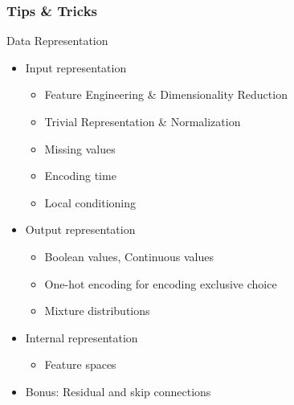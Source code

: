 \documentclass[8pt]{beamer}
\begin{document}
\begin{frame}
\frametitle{Tips \& Tricks}
 \begin{block}{Data Representation}
  \begin{itemize}
   \item Input representation
   \begin{itemize}
    \item Feature Engineering \& Dimensionality Reduction
    \item Trivial Representation \& Normalization
    \item Missing values
    \item Encoding time
    \item Local conditioning
   \end{itemize}
   \item Output representation
   \begin{itemize}
    \item Boolean values, Continuous values
    \item One-hot encoding for encoding exclusive choice
    \item Mixture distributions
   \end{itemize}
   \item Internal representation
   \begin{itemize}
    \item Feature spaces
   \end{itemize}
   \item Bonus: Residual and skip connections
  \end{itemize}
 \end{block}
\end{frame}
\end{document}
